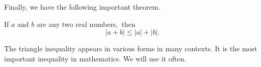 \ifcourse
\ifanalysis

Finally, we have the following important theorem.

\begin{theorem}  \label{thmtype:1.1.1}
If $a$ and $b$ are any two real numbers$,$ then
\begin{equation} \label{eq:1.1.3}
|a+b|\le |a|+|b|.
\end{equation}
\end{theorem}


The triangle inequality appears in various forms in many contexts.
It is  the most important inequality in mathematics. We will use it often.


\fi
\fi




